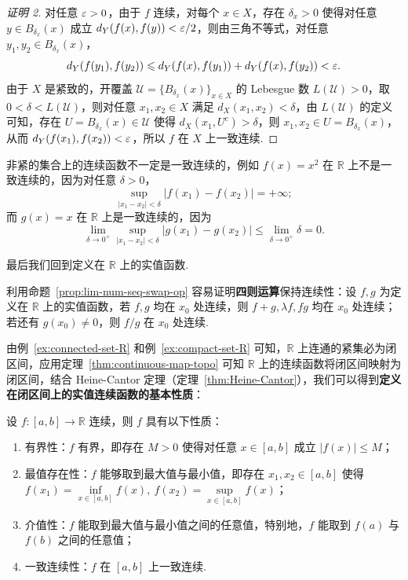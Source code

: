 \documentclass[../main.tex]{subfiles}
\begin{document}
\begin{proof}[证明 2]
    对任意 $\varepsilon > 0$，由于 $f$ 连续，对每个 $x \in X$，存在 $\delta_x > 0$ 使得对任意 $y \in B_{\delta_x}(x)$ 成立 $d_Y(f(x), f(y)) < \varepsilon / 2$，则由三角不等式，对任意 $y_1, y_2 \in B_{\delta_x}(x)$，
    $$
    d_Y(f(y_1), f(y_2)) \leqslant d_Y(f(x), f(y_1)) + d_Y(f(x), f(y_2)) < \varepsilon. 
    $$
    由于 $X$ 是紧致的，开覆盖 $\mathcal{U} = \{B_{\delta_x}(x)\}_{x \in X}$ 的 Lebesgue 数 $L(\mathcal{U}) > 0$，取 $0 < \delta < L(\mathcal{U})$，则对任意 $x_1, x_2 \in X$ 满足 $d_X(x_1, x_2) < \delta$，由 $L(\mathcal{U})$ 的定义可知，存在 $U = B_{\delta_x}(x) \in \mathcal{U}$ 使得 $d_X(x_1, U^c) > \delta$，则 $x_1, x_2 \in U = B_{\delta_x}(x)$，从而 $d_Y(f(x_1), f(x_2)) < \varepsilon$，所以 $f$ 在 $X$ 上一致连续. 
\end{proof}

\begin{remark}
    非紧的集合上的连续函数不一定是一致连续的，例如 $f(x) = x^2$ 在 $\mathbb R$ 上不是一致连续的，因为对任意 $\delta > 0$，
    $$
    \sup\limits_{|x_1 - x_2| < \delta} |f(x_1) - f(x_2)| = +\infty; 
    $$
    而 $g(x) = x$ 在 $\mathbb R$ 上是一致连续的，因为 
    $$
    \lim\limits_{\delta \to 0^+} \sup\limits_{|x_1 - x_2| < \delta} |g(x_1) - g(x_2)| \leqslant \lim\limits_{\delta \to 0^+} \delta = 0. 
    $$
\end{remark}

最后我们回到定义在 $\mathbb R$ 上的实值函数. 

利用命题~\ref{prop:lim-num-seq-swap-op} 容易证明\textbf{四则运算}保持连续性：设 $f, g$ 为定义在 $\mathbb R$ 上的实值函数，若 $f, g$ 均在 $x_0$ 处连续，则 $f + g, \lambda f, fg$ 均在 $x_0$ 处连续；若还有 $g(x_0) \neq 0$，则 $f / g$ 在 $x_0$ 处连续. 

由例~\ref{ex:connected-set-R} 和例~\ref{ex:compact-set-R} 可知，$\mathbb R$ 上连通的紧集必为闭区间，应用定理~\ref{thm:continuous-map-topo} 可知 $\mathbb R$ 上的连续函数将闭区间映射为闭区间，结合 Heine-Cantor 定理（定理~\ref{thm:Heine-Cantor}），我们可以得到\textbf{定义在闭区间上的实值连续函数的基本性质}：

\begin{theorem}[连续函数基本定理] \label{thm:continuous-func-close-set}
    设 $f:[a, b] \to \mathbb R$ 连续，则 $f$ 具有以下性质：
    \begin{enumerate}[label = (\alph*)]
        \item 有界性：$f$ 有界，即存在 $M > 0$ 使得对任意 $x \in [a, b]$ 成立 $|f(x)| \leqslant M$；
        \item 最值存在性：$f$ 能够取到最大值与最小值，即存在 $x_1, x_2 \in [a, b]$ 使得 $f(x_1) = \inf\limits_{x \in [a, b]} f(x),\ f(x_2) = \sup\limits_{x \in [a, b]} f(x)$；
        \item 介值性：$f$ 能取到最大值与最小值之间的任意值，特别地，$f$ 能取到 $f(a)$ 与 $f(b)$ 之间的任意值；
        \item 一致连续性：$f$ 在 $[a, b]$ 上一致连续. 
    \end{enumerate}
\end{theorem}
\end{document}

